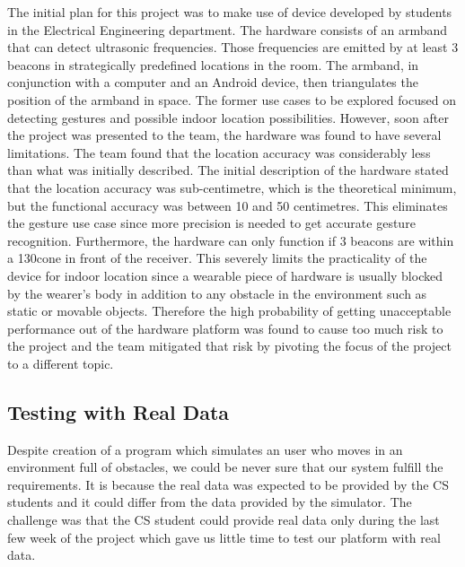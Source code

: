 \documentclass[prodmode,acmtosem]{acmsmall} %
\begin{document}
The initial plan for this project was to make use of device developed by students in the Electrical Engineering department. The hardware consists of an armband that can detect ultrasonic frequencies. Those frequencies are emitted by at least 3 beacons in strategically predefined locations in the room. The armband, in conjunction with a computer and an Android device, then triangulates the position of the armband in space.
The former use cases to be explored focused on detecting gestures and possible indoor location possibilities. However, soon after the project was presented to the team, the hardware was found to have several limitations. The team found that the location accuracy was considerably less than what was initially described. The initial description of the hardware stated that the location accuracy was sub-centimetre, which is the theoretical minimum, but the functional accuracy was between 10 and 50 centimetres. This eliminates the gesture use case since more precision is needed to get accurate gesture recognition.
Furthermore, the hardware can only function if 3 beacons are within a 130\degree cone in front of the receiver. This severely limits the practicality of the device for indoor location since a wearable piece of hardware is usually blocked by the wearer's body in addition to any obstacle in the environment such as static or movable objects.
Therefore the high probability of getting unacceptable performance out of the hardware platform was found to cause too much risk to the project and the team mitigated that risk by pivoting the focus of the project to a different topic.

\subsection{Testing with Real Data}
Despite creation of a program which simulates an user who moves in an environment full of obstacles, we could be never sure that our system fulfill the requirements. It is because the real data was expected to be provided by the CS students and it could differ from the data provided by the simulator. The challenge was that the CS student could provide real data only during the last few week of the project which gave us little time to test our platform with real data. 
\end{document}
